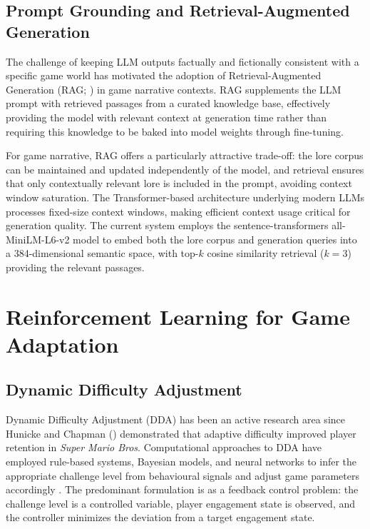 \documentclass[12pt,a4paper]{report}
\begin{document}
\subsection{Prompt Grounding and Retrieval-Augmented Generation}

The challenge of keeping LLM outputs factually and fictionally consistent with a specific game world has motivated the adoption of Retrieval-Augmented Generation (RAG; \citealp{lewis2020retrieval}) in game narrative contexts. RAG supplements the LLM prompt with retrieved passages from a curated knowledge base, effectively providing the model with relevant context at generation time rather than requiring this knowledge to be baked into model weights through fine-tuning.

For game narrative, RAG offers a particularly attractive trade-off: the lore corpus can be maintained and updated independently of the model, and retrieval ensures that only contextually relevant lore is included in the prompt, avoiding context window saturation. The Transformer-based architecture underlying modern LLMs \citep{vaswani2017attention} processes fixed-size context windows, making efficient context usage critical for generation quality. The current system employs the sentence-transformers all-MiniLM-L6-v2 model \citep{wang2020minilm} to embed both the lore corpus and generation queries into a 384-dimensional semantic space, with top-$k$ cosine similarity retrieval ($k = 3$) providing the relevant passages.

\section{Reinforcement Learning for Game Adaptation}

\subsection{Dynamic Difficulty Adjustment}

Dynamic Difficulty Adjustment (DDA) has been an active research area since Hunicke and Chapman (\citeyear{hunicke2004ai}) demonstrated that adaptive difficulty improved player retention in \textit{Super Mario Bros}. Computational approaches to DDA have employed rule-based systems, Bayesian models, and neural networks to infer the appropriate challenge level from behavioural signals and adjust game parameters accordingly \citep{lopes2017adaptive}. The predominant formulation is as a feedback control problem: the challenge level is a controlled variable, player engagement state is observed, and the controller minimizes the deviation from a target engagement state.
\end{document}
